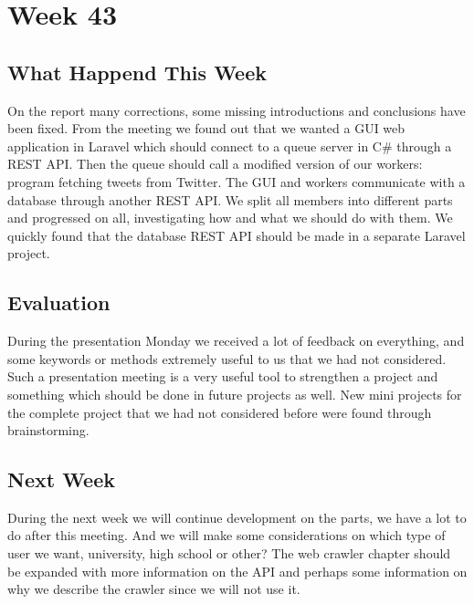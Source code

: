 \section*{Week 43}\label{Week43}
\subsection*{What Happend This Week}
On the report many corrections, some missing introductions and conclusions have
been fixed. From the meeting we found out that we wanted a \ac{GUI} web
application in Laravel which should connect to a
queue server in C\# through a \ac{REST} \ac{API}\citep{laravelIntro}. Then the queue
should call a modified version of our workers: program fetching tweets from Twitter. The
\ac{GUI} and workers communicate with a database through another \ac{REST}
\ac{API}. We split all members into different parts and progressed on all,
investigating how and what we should do with them. We quickly found that the
database \ac{REST} \ac{API} should be made in a separate Laravel project.

\subsection*{Evaluation}
During the presentation Monday we received a lot of feedback on everything, and
some keywords or methods extremely useful to us that we had not considered. Such
a presentation meeting is a very useful tool to strengthen a project and
something which should be done in future projects as well. New mini projects for
the complete project that we had not considered before were found through
brainstorming.

\subsection*{Next Week}
During the next week we will continue development on the parts, we have a lot to
do after this meeting. And we will make some considerations on which type of
user we want, university, high school or other? 
The web crawler chapter should be expanded with more information on the \ac{API}
and perhaps some information on why we describe the crawler since we will not
use it.


